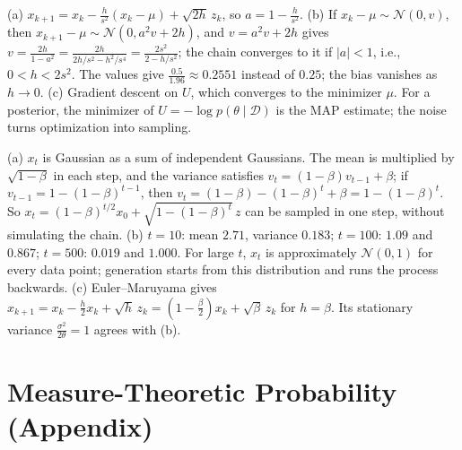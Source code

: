 \documentclass[11pt]{article}
\begin{document}
\begin{description}[leftmargin=0pt, itemsep=0.3em]
    \item[\ref{pr:ula}.] (a) $x_{k+1} = x_k - \frac{h}{s^2}(x_k - \mu) + \sqrt{2h}\,z_k$, so $a = 1 - \frac{h}{s^2}$. (b) If $x_k - \mu \sim \mathcal{N}(0, v)$, then $x_{k+1} - \mu \sim \mathcal{N}(0, a^2v + 2h)$, and $v = a^2v + 2h$ gives $v = \frac{2h}{1 - a^2} = \frac{2h}{2h/s^2 - h^2/s^4} = \frac{2s^2}{2 - h/s^2}$; the chain converges to it if $|a| < 1$, i.e., $0 < h < 2s^2$. The values give $\frac{0.5}{1.96} \approx 0.2551$ instead of $0.25$; the bias vanishes as $h \to 0$. (c) Gradient descent on $U$, which converges to the minimizer $\mu$. For a posterior, the minimizer of $U = -\log p(\theta \mid \mathcal{D})$ is the MAP estimate; the noise turns optimization into sampling.
    \item[\ref{pr:diffusion-forward}.] (a) $x_t$ is Gaussian as a sum of independent Gaussians. The mean is multiplied by $\sqrt{1 - \beta}$ in each step, and the variance satisfies $v_t = (1 - \beta)v_{t-1} + \beta$; if $v_{t-1} = 1 - (1 - \beta)^{t-1}$, then $v_t = (1 - \beta) - (1 - \beta)^t + \beta = 1 - (1 - \beta)^t$. So $x_t = (1 - \beta)^{t/2}x_0 + \sqrt{1 - (1 - \beta)^t}\,z$ can be sampled in one step, without simulating the chain. (b) $t = 10$: mean $2.71$, variance $0.183$; $t = 100$: $1.09$ and $0.867$; $t = 500$: $0.019$ and $1.000$. For large $t$, $x_t$ is approximately $\mathcal{N}(0, 1)$ for every data point; generation starts from this distribution and runs the process backwards. (c) Euler--Maruyama gives $x_{k+1} = x_k - \frac{h}{2}x_k + \sqrt{h}\,z_k = (1 - \frac{\beta}{2})x_k + \sqrt{\beta}\,z_k$ for $h = \beta$. Its stationary variance $\frac{\sigma^2}{2\theta} = 1$ agrees with (b).
\end{description}

\section*{Measure-Theoretic Probability (Appendix)}
\end{document}
